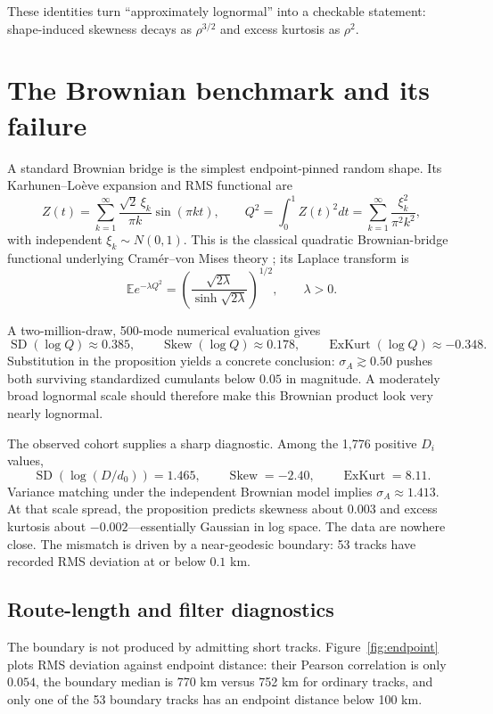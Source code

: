 \documentclass[10pt]{article}
\theoremstyle{aerostat}
\newcommand{\E}{\mathbb E}
\newcommand{\Skew}{\operatorname{Skew}}
\newcommand{\ExKurt}{\operatorname{ExKurt}}
\begin{document}
These identities turn ``approximately lognormal'' into a checkable statement: shape-induced skewness decays as $\rho^{3/2}$ and excess kurtosis as $\rho^2$.

\section{The Brownian benchmark and its failure}

A standard Brownian bridge is the simplest endpoint-pinned random shape. Its Karhunen--Lo\`eve expansion and RMS functional are
\begin{equation}
Z(t)=\sum_{k=1}^\infty\frac{\sqrt2\,\xi_k}{\pi k}\sin(\pi kt),
\qquad
Q^2=\int_0^1Z(t)^2dt=\sum_{k=1}^\infty\frac{\xi_k^2}{\pi^2k^2},
\end{equation}
with independent $\xi_k\sim N(0,1)$. This is the classical quadratic Brownian-bridge functional underlying Cram\'er--von Mises theory \cite{anderson1952}; its Laplace transform is
\begin{equation}
\E e^{-\lambda Q^2}
=\left(\frac{\sqrt{2\lambda}}{\sinh\sqrt{2\lambda}}\right)^{1/2},
\qquad \lambda>0.
\end{equation}

A two-million-draw, 500-mode numerical evaluation gives
\[
\operatorname{SD}(\log Q)\approx0.385,\qquad
\Skew(\log Q)\approx0.178,\qquad
\ExKurt(\log Q)\approx-0.348.
\]
Substitution in the proposition yields a concrete conclusion: $\sigma_A\gtrsim0.50$ pushes both surviving standardized cumulants below $0.05$ in magnitude. A moderately broad lognormal scale should therefore make this Brownian product look very nearly lognormal.

The observed cohort supplies a sharp diagnostic. Among the 1,776 positive $D_i$ values,
\[
\operatorname{SD}(\log(D/d_0))=1.465,\qquad
\Skew=-2.40,\qquad
\ExKurt=8.11.
\]
Variance matching under the independent Brownian model implies $\sigma_A\approx1.413$. At that scale spread, the proposition predicts skewness about $0.003$ and excess kurtosis about $-0.002$---essentially Gaussian in log space. The data are nowhere close. The mismatch is driven by a near-geodesic boundary: 53 tracks have recorded RMS deviation at or below $0.1$ km.

\subsection{Route-length and filter diagnostics}

The boundary is not produced by admitting short tracks. Figure~\ref{fig:endpoint}
plots RMS deviation against endpoint distance: their Pearson correlation is only
$0.054$, the boundary median is 770 km versus 752 km for ordinary tracks, and
only one of the 53 boundary tracks has an endpoint distance below 100 km.
\end{document}
